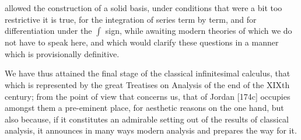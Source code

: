 allowed the construction of a solid basis, under conditions that were a bit too restrictive it is true, for the integration of series term by term, and for differentiation under the \(\int\) sign, while awaiting modern theories of which we do not have to speak here, and which would clarify these questions in a manner which is provisionally definitive.

We have thus attained the final stage of the classical infinitesimal calculus, that which is represented by the great Treatises on Analysis of the end of the XIXth century; from the point of view that concerns us, that of Jordan {[}174c{]} occupies amongst them a pre-eminent place, for aesthetic reasons on the one hand, but also because, if it constitutes an admirable setting out of the results of classical analysis, it announces in many ways modern analysis and prepares the way for it.


